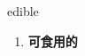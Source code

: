 
\begin{frame}
{\huge edible}
\begin{center}
\begin{enumerate}\Large
  \item \textbf{可食用的}
\end{enumerate}
\end{center}
\end{frame}
